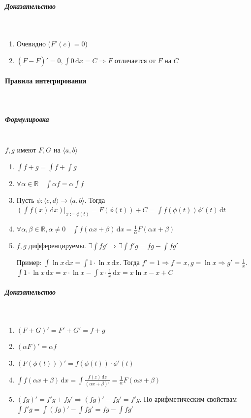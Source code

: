 \documentclass{article}
\def\D{\,\mathrm{d}}
\let\vanillaparagraph\paragraph
\let\vanillasubparagraph\subparagraph
\renewcommand{\paragraph}[1]{\vanillaparagraph{#1}\mbox{}\\}
\renewcommand{\subparagraph}[1]{\vanillasubparagraph{#1}\mbox{}\\}
\begin{document}
\subparagraph{Доказательство}
\begin{enumerate}
    \item Очевидно ($F'(c) = 0$)
    \item $(\overline{F} - F)' = 0, \int 0 \D x = C \Rightarrow \overline{F}$ отличается от $F$ на $C$
\end{enumerate}


\paragraph{Правила интегрирования}
\subparagraph{Формулировка}
$f, g$ имеют $F, G$ на $\langle a, b\rangle$

\begin{enumerate}
    \item $\int f + g = \int f + \int g$
    \item $\forall \alpha \in \mathbb{R} \quad \int \alpha f = \alpha \int f$
    \item Пусть $\phi: \langle c, d \rangle \rightarrow \langle a, b \rangle$. Тогда $(\int f(x) \D x)|_{x:= \phi(t)} = F(\phi(t)) + C = \int f(\phi(t))\phi'(t) \D t$
    \item $\forall \alpha, \beta \in \mathbb{R}, \alpha \ne 0 \quad \int f(\alpha x + \beta) \D x = \frac{1}{\alpha}F(\alpha x + \beta)$
    \item $f, g$ дифференцируемы. $\exists \int fg' \Rightarrow \exists \int f'g = fg - \int fg'$
    
    Пример: $\int \ln x \D x = \int 1 \cdot \ln x \D x$. Тогда $f' = 1 \Rightarrow f = x, g = \ln x \Rightarrow g' = \frac{1}{x}$. $\int 1 \cdot \ln x \D x = x \cdot \ln x - \int x \cdot \frac{1}{x} \D x = x\ln x - x + C$ 
\end{enumerate}

\subparagraph{Доказательство}
\begin{enumerate}
    \item $(F + G)' = F' + G' = f+g$
    \item $(\alpha F)' = \alpha f$
    \item $(F(\phi(t)))' = f(\phi(t)) \cdot \phi'(t)$
    \item $\int f(\alpha x + \beta) \D x = \int \frac{f(z) \D z}{(\alpha x + \beta)'} = \frac{1}{\alpha}F(\alpha x + \beta)$
    \item $(fg)' = f'g + fg' \Rightarrow (fg)' - fg' = f'g$. По арифметическим свойствам $\int f'g = \int (fg)' - \int fg' = fg - \int fg'$
\end{enumerate}
\end{document}
